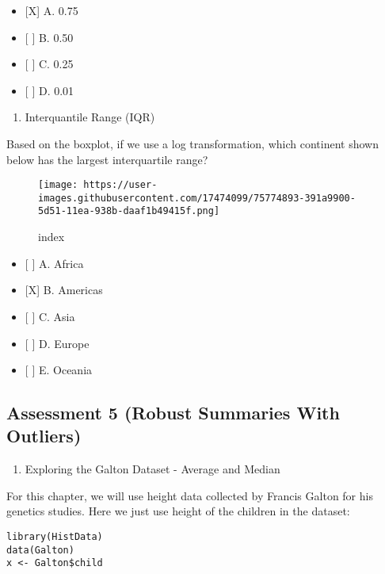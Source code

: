 \documentclass[]{article}
\providecommand{\tightlist}{%
  \setlength{\itemsep}{0pt}\setlength{\parskip}{0pt}}
\begin{document}
\begin{itemize}
\tightlist
\item
  {[}X{]} A. 0.75
\item
  {[} {]} B. 0.50
\item
  {[} {]} C. 0.25
\item
  {[} {]} D. 0.01
\end{itemize}

\begin{enumerate}
\def\labelenumi{\arabic{enumi}.}
\setcounter{enumi}{6}
\tightlist
\item
  Interquantile Range (IQR)
\end{enumerate}

Based on the boxplot, if we use a log transformation, which continent
shown below has the largest interquartile range?

\begin{figure}
\centering
\texttt{[image: https://user-images.githubusercontent.com/17474099/75774893-391a9900-5d51-11ea-938b-daaf1b49415f.png]}
\caption{index}
\end{figure}

\begin{itemize}
\tightlist
\item
  {[} {]} A. Africa
\item
  {[}X{]} B. Americas
\item
  {[} {]} C. Asia
\item
  {[} {]} D. Europe
\item
  {[} {]} E. Oceania
\end{itemize}

\hypertarget{assessment-5-robust-summaries-with-outliers}{%
\subsection{Assessment 5 (Robust Summaries With
Outliers)}\label{assessment-5-robust-summaries-with-outliers}}

\begin{enumerate}
\def\labelenumi{\arabic{enumi}.}
\tightlist
\item
  Exploring the Galton Dataset - Average and Median
\end{enumerate}

For this chapter, we will use height data collected by Francis Galton
for his genetics studies. Here we just use height of the children in the
dataset:

\begin{verbatim}
library(HistData)
data(Galton)
x <- Galton$child
\end{verbatim}
\end{document}
